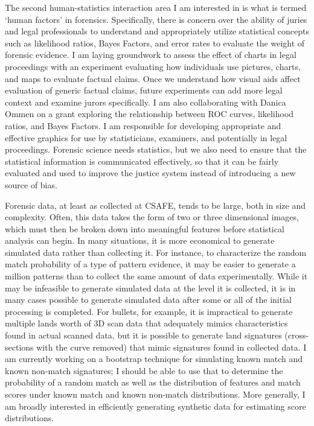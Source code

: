 \documentclass[12pt, letterpaper, sans]{moderncv}
\begin{document}
The second human-statistics interaction area I am interested in is what is termed `human factors' in forensics. Specifically, there is concern over the ability of juries and legal professionals to understand and appropriately utilize statistical concepts such as likelihood ratios, Bayes Factors, and error rates to evaluate the weight of forensic evidence. I am laying groundwork to assess the effect of charts in legal proceedings with an experiment evaluating how individuals use pictures, charts, and maps to evaluate factual claims. Once we understand how visual aids affect evaluation of generic factual claims, future experiments can add more legal context and examine jurors specifically. I am also collaborating with Danica Ommen on a grant exploring the relationship between ROC curves, likelihood ratios, and Bayes Factors. I am responsible for developing appropriate and effective graphics for use by statisticians, examiners, and potentially in legal proceedings. Forensic science needs statistics, but we also need to ensure that the statistical information is communicated effectively, so that it can be fairly evaluated and used to improve the justice system instead of introducing a new source of bias. 

Forensic data, at least as collected at CSAFE, tends to be large, both in size and complexity. Often, this data takes the form of two or three dimensional images, which must then be broken down into meaningful features before statistical analysis can begin. In many situations, it is more economical to generate simulated data rather than collecting it. For instance, to characterize the random match probability of a type of pattern evidence, it may be easier to generate a million patterns than to collect the same amount of data experimentally. While it may be infeasible to generate simulated data at the level it is collected, it is in many cases possible to generate simulated data after some or all of the initial processing is completed. For bullets, for example, it is impractical to generate multiple lands worth of 3D scan data that adequately mimics characteristics found in actual scanned data, but it is possible to generate land signatures (cross-sections with the curve removed) that mimic signatures found in collected data. I am currently working on a bootstrap technique for simulating known match and known non-match signatures; I should be able to use that to determine the probability of a random match as well as the distribution of features and match scores under known match and known non-match distributions. More generally, I am broadly interested in efficiently generating synthetic data for estimating score distributions. 
\end{document}

